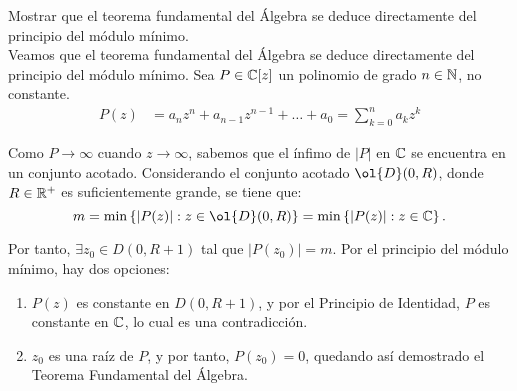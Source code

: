 \begin{ejercicio}
    Mostrar que el teorema fundamental del Álgebra se deduce directamente del principio del módulo mínimo.\\

    Veamos que el teorema fundamental del Álgebra se deduce directamente del principio del módulo mínimo. Sea $P\in \mathbb{C}[z]$ un polinomio de grado $n\in \mathbb{N}$, no constante. 
    \begin{align*}
        P(z) &= a_n z^n + a_{n-1} z^{n-1} + \ldots + a_0 = \sum_{k=0}^n a_k z^k
    \end{align*}
    
    
    Como $P\to \infty$ cuando $z \to \infty$, sabemos que el ínfimo de $|P|$ en $\mathbb{C}$ se encuentra en un conjunto acotado. Considerando el conjunto acotado $\ol{D}(0,R)$, donde $R\in \mathbb{R}^+$ es suficientemente grande, se tiene que:
    \begin{equation*}
        m = \min\left\{ |P(z)| : z\in \ol{D}(0,R) \right\} = \min\left\{ |P(z)| : z\in \bb{C} \right\}.
    \end{equation*}

    Por tanto, $\exists z_0\in D(0,R+1)$ tal que $|P(z_0)| = m$. Por el principio del módulo mínimo, hay dos opciones:
    \begin{enumerate}
        \item $P(z)$ es constante en $D(0,R+1)$, y por el Principio de Identidad, $P$ es constante en $\mathbb{C}$, lo cual es una contradicción.
        \item $z_0$ es una raíz de $P$, y por tanto, $P(z_0) = 0$, quedando así demostrado el Teorema Fundamental del Álgebra.
    \end{enumerate}
\end{ejercicio}

